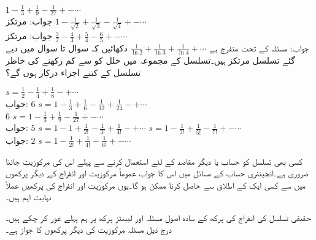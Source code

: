 \quad
$1-\tfrac{1}{3}+\tfrac{1}{9}-\tfrac{1}{27}+-\cdots$\\
جواب:\quad
مرتکز
\quad
$1-\tfrac{1}{\sqrt{2}}+\tfrac{1}{\sqrt{3}}-\tfrac{1}{\sqrt{4}}+-\cdots$\\
جواب:\quad
مرتکز
\quad
$\tfrac{3}{2}-\tfrac{4}{3}+\tfrac{5}{4}-\tfrac{6}{5}+-\cdots$\\
جواب:\quad
مسئلہ  کے تحت منفرج  ہے
\quad
$\tfrac{1}{\ln 2}+\tfrac{1}{\ln 3}+\tfrac{1}{\ln 4}+\cdots$
دکھائیں کہ سوال  تا سوال  میں دیے گئے تسلسل مرتکز ہیں۔تسلسل کے مجموعہ  میں خلل  کو  سے کم رکھنے کی خاطر تسلسل کے کتنے اجزاء درکار ہوں گے؟

\quad
$s=\tfrac{1}{2}-\tfrac{1}{4}+\tfrac{1}{8}-+\cdots$\\
جواب:\quad 
$6$
\quad
$s=1-\tfrac{1}{3}+\tfrac{1}{6}-\tfrac{1}{12}+\tfrac{1}{24}-+\cdots$\\
$6$
\quad
$s=1-\tfrac{1}{3}+\tfrac{1}{9}-\tfrac{1}{27}+-\cdots$\\
جواب:\quad
$5$
\quad
$s=1-1+\tfrac{1}{2!}-\tfrac{1}{3!}+\tfrac{1}{4!}-+\cdots$
\quad
$s=1-\tfrac{1}{3!}+\tfrac{1}{5!}-\tfrac{1}{7!}+-\cdots$\\
جواب:\quad
$2$
\quad
$s=1-\tfrac{1}{2!}+\tfrac{1}{4!}-\tfrac{1}{6!}+-\cdots$

کسی بھی تسلسل کو حساب یا دیگر مقاصد کے لئے استعمال کرنے سے پہلے اس کی مرکوزیت جاننا ضروری ہے۔انجینئری حساب کے مسائل میں اس کا جواب عموماً مرکوزیت اور انفراج کے دیگر پرکھوں میں سے کسی ایک کے اطلاق سے حاصل کرنا ممکن ہو گا۔یوں مرکوزیت اور انفراج کی پرکھیں عملاً نہایت اہم ہیں۔

حقیقی تسلسل کی انفراج کی پرکھ کے سادہ اصول مسئلہ  اور لیبنٹز پرکھ پر ہم پہلے غور کر چکے ہیں۔ درج ذیل مسئلہ مرکوزیت کی دیگر پرکھوں کا جواز ہے۔

